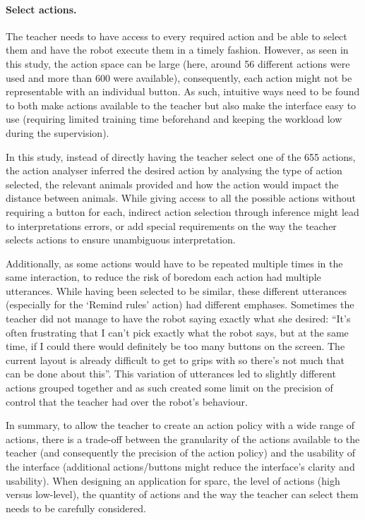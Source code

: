\paragraph{Select actions.} %

The teacher needs to have access to every required action and be able to select them and have the robot execute them in a timely fashion. However, as seen in this study, the action space can be large (here, around 56 different actions were used and more than 600 were available), consequently, each action might not be representable with an individual button. As such, intuitive ways need to be found to both make actions available to the teacher but also make the interface easy to use (requiring limited training time beforehand and keeping the workload low during the supervision). 

In this study, instead of directly having the teacher select one of the 655 actions, the action analyser inferred the desired action by analysing the type of action selected, the relevant animals provided and how the action would impact the distance between animals. While giving access to all the possible actions without requiring a button for each, indirect action selection through inference might lead to interpretations errors, or add special requirements on the way the teacher selects actions to ensure unambiguous interpretation. 

Additionally, as some actions would have to be repeated multiple times in the same interaction, to reduce the risk of boredom each action had multiple utterances. While having been selected to be similar, these different utterances (especially for the `Remind rules' action) had different emphases. Sometimes the teacher did not manage to have the robot saying exactly what she desired: ``It’s often frustrating that I can’t pick exactly what the robot says, but at the same time, if I could there would definitely be too many buttons on the screen. The current layout is already difficult to get to grips with so there’s not much that can be done about this''. This variation of utterances led to slightly different actions grouped together and as such created some limit on the precision of control that the teacher had over the robot's behaviour.

In summary, to allow the teacher to create an action policy with a wide range of actions, there is a trade-off between the granularity of the actions available to the teacher (and consequently the precision of the action policy) and the usability of the interface (additional actions/buttons might reduce the interface's clarity and usability). When designing an application for \gls{sparc}, the level of actions (high versus low-level), the quantity of actions and the way the teacher can select them needs to be carefully considered.

